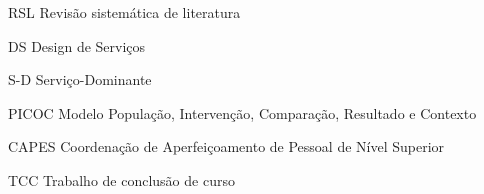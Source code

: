 \begin{siglas}
  \item[RSL] Revisão sistemática de literatura
  \item[DS] Design de Serviços
  \item[S-D] Serviço-Dominante
  \item[PICOC] Modelo População, Intervenção, Comparação, Resultado e Contexto
  \item[CAPES] Coordenação de Aperfeiçoamento de Pessoal de Nível Superior
  \item[TCC] Trabalho de conclusão de curso

\end{siglas}
